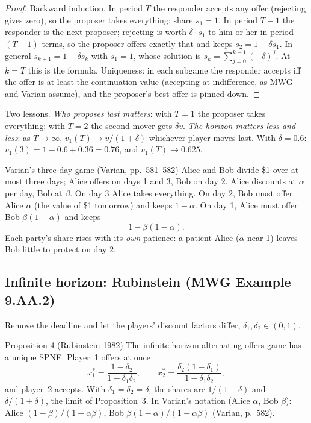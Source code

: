 \begin{proof}
Backward induction. In period $T$ the responder accepts any offer (rejecting gives zero), so the
proposer takes everything: share $s_1 = 1$. In period $T-1$ the responder is the next proposer;
rejecting is worth $\delta \cdot s_1$ to him or her in period-$(T-1)$ terms, so the proposer
offers exactly that and keeps $s_2 = 1 - \delta s_1$. In general $s_{k+1} = 1 - \delta s_k$ with
$s_1 = 1$, whose solution is $s_k = \sum_{j=0}^{k-1}(-\delta)^j$. At $k = T$ this is the formula.
Uniqueness: in each subgame the responder accepts iff the offer is at least the continuation
value (accepting at indifference, as MWG and Varian assume), and the proposer's best offer is
pinned down.
\end{proof}

Two lessons. \emph{Who proposes last matters}: with $T = 1$ the proposer takes everything; with
$T = 2$ the second mover gets $\delta v$. \emph{The horizon matters less and less}: as
$T \to \infty$, $v_1(T) \to v/(1+\delta)$ whichever player moves last. With $\delta = 0.6$:
$v_1(3) = 1 - 0.6 + 0.36 = 0.76$, and $v_1(T) \to 0.625$.

\begin{example}{Varian's three-day game (Varian, pp.~581--582)}
Alice and Bob divide \$1 over at most three days; Alice offers on days 1 and 3, Bob on day 2.
Alice discounts at $\alpha$ per day, Bob at $\beta$. On day 3 Alice takes everything. On day 2,
Bob must offer Alice $\alpha$ (the value of \$1 tomorrow) and keeps $1 - \alpha$. On day 1, Alice
must offer Bob $\beta(1 - \alpha)$ and keeps
\[
  1 - \beta(1 - \alpha).
\]
Each party's share rises with its \emph{own} patience: a patient Alice ($\alpha$ near 1) leaves
Bob little to protect on day 2.
\end{example}

\subsection{Infinite horizon: Rubinstein (MWG Example 9.AA.2)}

Remove the deadline and let the players' discount factors differ, $\delta_1, \delta_2 \in (0,1)$.

\begin{prop}{Proposition 4 (Rubinstein 1982)}
The infinite-horizon alternating-offers game has a unique SPNE. Player~1 offers at once
\[
  x_1^* = \frac{1 - \delta_2}{1 - \delta_1\delta_2}, \qquad x_2^* = \frac{\delta_2(1 - \delta_1)}{1 - \delta_1\delta_2},
\]
and player~2 accepts. With $\delta_1 = \delta_2 = \delta$, the shares are $1/(1+\delta)$ and
$\delta/(1+\delta)$, the limit of Proposition~3. In Varian's notation (Alice $\alpha$, Bob
$\beta$): Alice $(1-\beta)/(1-\alpha\beta)$, Bob $\beta(1-\alpha)/(1-\alpha\beta)$ (Varian, p.~582).
\end{prop}

